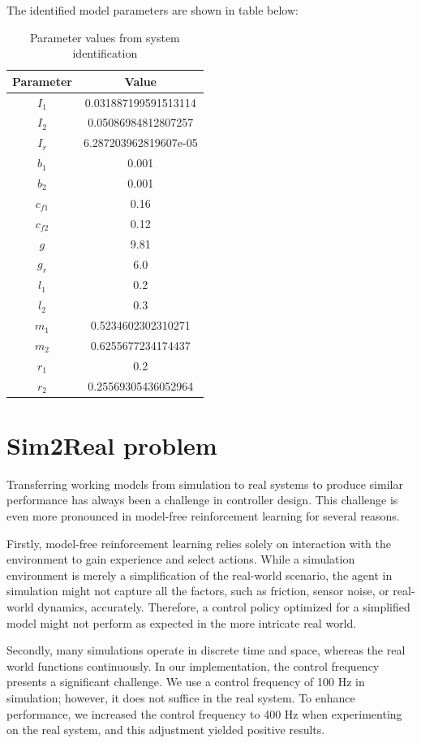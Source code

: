 The identified model parameters are shown in table below:

\begin{table}[H]
\centering
\begin{tabular}{|c|c|}
\hline
\textbf{Parameter} & \textbf{Value} \\
\hline
$I_1$ & 0.031887199591513114 \\
$I_2$ & 0.05086984812807257 \\
$I_r$ & 6.287203962819607e-05 \\
$b_1$ & 0.001 \\
$b_2$ & 0.001 \\
$c_{f1}$ & 0.16 \\
$c_{f2}$ & 0.12 \\
$g$ & 9.81 \\
$g_r$ & 6.0 \\
$l_1$ & 0.2 \\
$l_2$ & 0.3 \\
$m_1$ & 0.5234602302310271 \\
$m_2$ & 0.6255677234174437 \\
$r_1$ & 0.2 \\
$r_2$ & 0.25569305436052964 \\
\hline
\end{tabular}
\caption{Parameter values from system identification}
\label{tab:parameters}
\end{table}


\section{Sim2Real problem}
Transferring working models from simulation to real systems to produce similar performance has always been a challenge in controller design. This challenge is even more pronounced in model-free reinforcement learning for several reasons.

Firstly, model-free reinforcement learning relies solely on interaction with the environment to gain experience and select actions. While a simulation environment is merely a simplification of the real-world scenario, the agent in simulation might not capture all the factors, such as friction, sensor noise, or real-world dynamics, accurately. Therefore, a control policy optimized for a simplified model might not perform as expected in the more intricate real world.

Secondly, many simulations operate in discrete time and space, whereas the real world functions continuously. In our implementation, the control frequency presents a significant challenge. We use a control frequency of 100 Hz in simulation; however, it does not suffice in the real system. To enhance performance, we increased the control frequency to 400 Hz when experimenting on the real system, and this adjustment yielded positive results.

